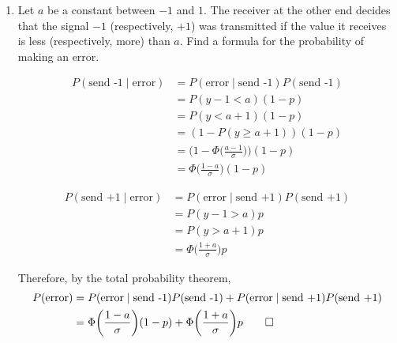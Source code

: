 \documentclass[paper=usletter, fontsize=12pt]{article}
\begin{document}
\begin{enumerate}
\begin{enumerate}
            \item Let $a$ be a constant between $-1$ and $1$. The receiver at
            the other end decides that the signal $-1$ (respectively, $+1$) was
            transmitted if the value it receives is less (respectively, more)
            than $a$. Find a formula for the probability of making an error.
            \begin{cproof}

                \begin{align*}
                    P(\text{send -1} \mid \text{error}) & = P(\text{error} \mid \text{send -1})P(\text{send -1})\\
                    & = P(y-1 < a)(1-p)\\
                    & = P(y < a+1)(1-p)\\
                    & = (1-P(y \ge a+1))(1-p)\\
                    & = \bigg(1-\Phi\bigg(\frac{a-1}{\sigma}\bigg)\bigg)(1-p)\\
                    & = \Phi\bigg(\frac{1-a}{\sigma}\bigg)(1-p)
                \end{align*}
                \endgroup

                \begin{align*}
                    P(\text{send +1} \mid \text{error}) & = P(\text{error} \mid \text{send +1})P(\text{send +1})\\
                    & = P(y-1 > a)p\\
                    & = P(y > a+1)p\\
                    & = \Phi\bigg(\frac{1+a}{\sigma}\bigg)p
                \end{align*}
                \endgroup

                Therefore, by the total probability theorem,
                \begin{align*}
                    P(\text{error}) & = P(\text{error} \mid \text{send -1})P(\text{send -1}) + P(\text{error} \mid \text{send +1})P(\text{send +1})\\
                    & = \Phi\bigg(\frac{1-a}{\sigma}\bigg)(1-p) + \Phi\bigg(\frac{1+a}{\sigma}\bigg)p \qedhere
                \end{align*}
                \endgroup

            \end{cproof}


\end{enumerate}
\end{enumerate}
\end{document}
